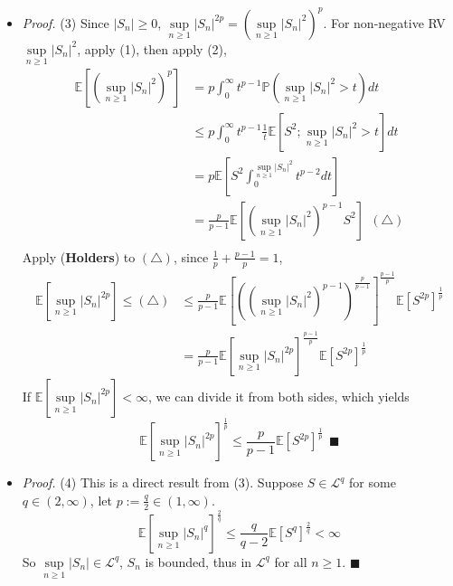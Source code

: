 \documentclass[a4paper,12pt,twoside]{book}
\begin{document}
\begin{itemize}
	\item[]\textit{Proof.} (3) Since $|S_n|\geq 0$, $\sup\limits_{n\geq 1}|S_n|^{2p}=(\sup\limits_{n\geq 1}|S_n|^2)^{p}$. For non-negative RV $\sup\limits_{n\geq 1}|S_n|^2$, apply (1), then apply (2),
	\begin{equation}
		\begin{split}
			\mathbb{E}\left[(\sup\limits_{n\geq 1}|S_n|^{2})^p\right]&=p\int_0^{\infty}t^{p-1}\mathbb{P}\left(\sup\limits_{n\geq 1}|S_n|^2>t\right)dt\\
			&\leq p\int_0^{\infty}t^{p-1}\frac{1}{t}\mathbb{E}\left[S^2; \sup\limits_{n\geq 1}|S_n|^2>t\right] dt\\
			&=p \mathbb{E}\left[S^2\int_0^{\sup\limits_{n\geq 1}|S_n|^2}t^{p-2}dt\right]\\
			&= \frac{p}{p-1} \mathbb{E}\left[(\sup\limits_{n\geq 1}|S_n|^2)^{p-1}S^2\right]~~(\triangle)\\
		\end{split}
	\end{equation}
	Apply (\textbf{Holders}) to $(\triangle)$, since $\frac{1}{p}+\frac{p-1}{p}=1$,
	\begin{equation}
		\begin{split}
			\mathbb{E}\left[\sup\limits_{n\geq 1}|S_n|^{2p}\right]\leq (\triangle) &\leq \frac{p}{p-1} \mathbb{E}\left[((\sup\limits_{n\geq 1}|S_n|^2)^{p-1})^{\frac{p}{p-1}}\right]^{\frac{p-1}{p}} \mathbb{E}\left[S^{2p}\right]^{\frac{1}{p}}\\
			&=\frac{p}{p-1} \mathbb{E}\left[\sup\limits_{n\geq 1}|S_n|^{2p}\right]^{\frac{p-1}{p}} \mathbb{E}\left[S^{2p}\right]^{\frac{1}{p}}
		\end{split}
	\end{equation}
	If $\mathbb{E}\left[\sup\limits_{n\geq 1}|S_n|^{2p}\right]<\infty$, we can divide it from both sides, which yields
	\begin{equation}
		\mathbb{E}\left[\sup\limits_{n\geq 1}|S_n|^{2p}\right]^{\frac{1}{p}}\leq \frac{p}{p-1} \mathbb{E}\left[S^{2p}\right]^{\frac{1}{p}}~~\blacksquare
	\end{equation}

	\item[]\textit{Proof.} (4) This is a direct result from (3). Suppose $S \in \mathcal{L}^q$ for some $q\in (2, \infty)$, let $p:=\frac{q}{2}\in (1, \infty)$.
	\begin{equation}
	 	\mathbb{E}\left[\sup\limits_{n\geq 1}|S_n|^{q}\right]^{\frac{2}{q}}\leq \frac{q}{q-2} \mathbb{E}\left[S^{q}\right]^{\frac{2}{q}}<\infty
	\end{equation} 
	So $\sup\limits_{n\geq 1}|S_n| \in \mathcal{L}^q$, $S_n$ is bounded, thus in $\mathcal{L}^q$ for all $n\geq 1$. $\blacksquare$


\end{itemize}
\end{document}
